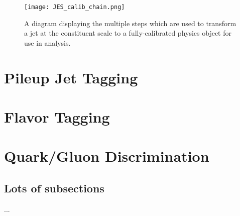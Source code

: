 
\begin{figure}
\centering
\texttt{[image: JES\_calib\_chain.png]}
\label{fig:jet-reconstruction:making-jets}
\caption{A diagram displaying the multiple steps which are used to transform a jet at the constituent scale to a fully-calibrated physics object for use in analysis.}
\end{figure}


\section{Pileup Jet Tagging}
\label{jet-reconstruction:pileup-jet-tagging}

\section{Flavor Tagging}

\section{Quark/Gluon Discrimination}
	\subsection{Lots of subsections}
		...